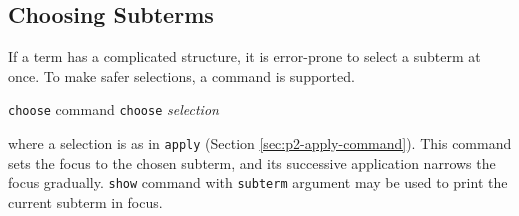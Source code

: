 \documentclass[a4paper]{memoir}
\begin{document}
\subsection{Choosing Subterms}\label{sec:p2-choose-command}

If a term has a complicated structure, it is error-prone to
select a subterm at once. To make safer selections, a command
is supported.

\begin{bsyntax} \texttt{choose} command \Hline
\texttt{choose} \textit{selection}
\end{bsyntax}

where a selection is as in \verb|apply|
(Section \ref{sec:p2-apply-command}). This command
sets the focus to the chosen subterm, and its successive application
narrows the focus gradually.
\verb|show| command with \verb|subterm| argument may be used to print
the current subterm in focus.
\end{document}

